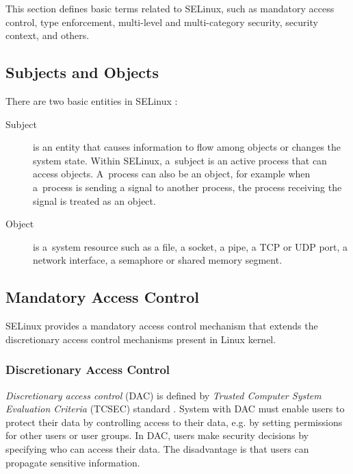 This section defines basic terms related to SELinux, such as mandatory access
control, type enforcement, multi-level and multi-category security, security
context, and others.

\subsection{Subjects and Objects}
There are two basic entities in SELinux \cite[p.~29]{tsn}:
\begin{description}
    \item [Subject] is an entity that causes information to flow among objects
        or changes the system state. Within SELinux, a~subject is an active
        process that can access objects. A~process can also be an object, for
        example when a~process is sending a signal to another process, the
        process receiving the signal is treated as an object.
    \item [Object] is a~system resource such as a file, a socket, a pipe, a TCP
        or UDP port, a network interface, a semaphore or shared memory segment.
\end{description}

\subsection{Mandatory Access Control}

SELinux provides a mandatory access control mechanism that extends the
discretionary access control mechanisms present in Linux kernel.

\subsubsection{Discretionary Access Control}
\emph{Discretionary access control} (DAC) is defined by \emph{Trusted Computer
System Evaluation Criteria} (TCSEC) standard \cite{orangebook}. System with DAC
must enable users to protect their data by controlling access to their data,
e.g. by setting permissions for other users or user groups. In DAC, users make
security decisions by specifying who can access their data. The disadvantage is
that users can propagate sensitive information.

